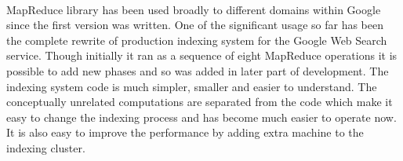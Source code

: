 \documentclass[8pt]{extarticle}
\begin{document}
\paragraph{}
MapReduce library has been used broadly to different domains within Google since the first version was written. One of the significant usage so far has been the complete rewrite of production indexing system for the Google Web Search service. Though initially it ran as a sequence of eight MapReduce operations it is possible to add new phases and so was added in later part of development. The indexing system code is much simpler, smaller and easier to understand. The conceptually unrelated computations are separated from the code which make it easy to change the indexing process and has become much easier to operate now. It is also easy to improve the performance by adding extra machine to the indexing cluster.
\end{document}
